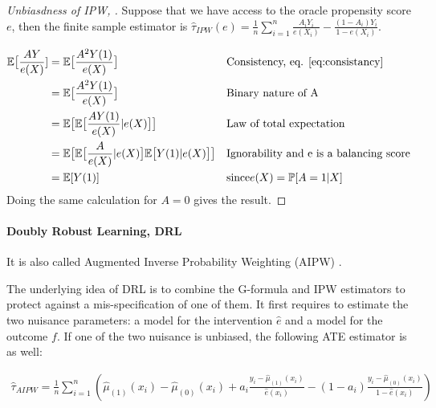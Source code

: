 \documentclass[french,12pt,twoside,a4paper]{book}
\newtheorem{proof}{Proof}
\begin{document}
\begin{appendices}
\begin{proof}[Unbiasdness of IPW, \citep{rosenbaum_central_1983}]
    Suppose that we have access to the oracle propensity score $e$, then the
    finite sample estimator is $\hat{\tau}_{IPW}(e)=\frac{1}{n} \sum_{i=1}^{n}
      \frac{A_{i} Y_{i}}{e\left(X_{i}\right)}-\frac{(1-A_{i})
      Y_{i}}{1-e\left(X_{i}\right)}$.

    \begin{align*}
      \mathbb E \big[\frac{A Y}{e(X)}] & =\mathbb E \big[\frac{A^2 Y(1)}{e(X)}\big]                                                  &  & \text{Consistency, eq. \ref{eq:consistancy}}   \\
                                       & =\mathbb E \big[\frac{A^2 Y(1)}{e(X)}\big]                                                  &  & \text{Binary nature of A}                      \\
                                       & =\mathbb E \big[\mathbb E \big[\frac{A Y(1)}{e(X)}|e(X)\big]\big]                           &  & \text{Law of total expectation}                \\
                                       & =\mathbb E \big[\mathbb E \big[\frac{A}{e(X)}|e(X)\big] \mathbb E \big[Y(1)|e(X)\big] \big] &  & \text{Ignorability and e is a balancing score} \\
                                       & =\mathbb E[Y(1)]                                                                            &  & \text{since} e(X)=\mathbb P[A=1|X]
    \end{align*}
    Doing the same calculation for $A=0$ gives the result.
  \end{proof}

  \paragraph{Doubly Robust Learning, DRL} It is also called Augmented Inverse
  Probability Weighting (AIPW) \citep{robins1994estimation}.

  The underlying idea of DRL is to combine the G-formula and IPW estimators to
  protect against a mis-specification of one of them. It first requires to
  estimate the two nuisance parameters: a model for the intervention $\hat{e}$
  and a model for the outcome $f$. If one of the two nuisance is unbiased, the
  following ATE estimator is as well:

  $$\begin{aligned} \widehat{\tau}_{A I P W}=\frac{1}{n}
      \sum_{i=1}^{n}\left(\hat \mu_{(1)}\left(x_{i}\right)-\hat \mu_{(0)}\left(x_{i}\right)+a_{i}
      \frac{y_{i}-\hat \mu_{(1)}\left(x_{i}\right)}{\hat{e}\left(x_{i}\right)}-\left(1-a_{i}\right)
      \frac{y_{i}-\hat \mu_{(0)}\left(x_{i}\right)}{1-\hat{e}\left(x_{i}\right)}\right)
    \end{aligned}$$


\end{appendices}
\end{document}
